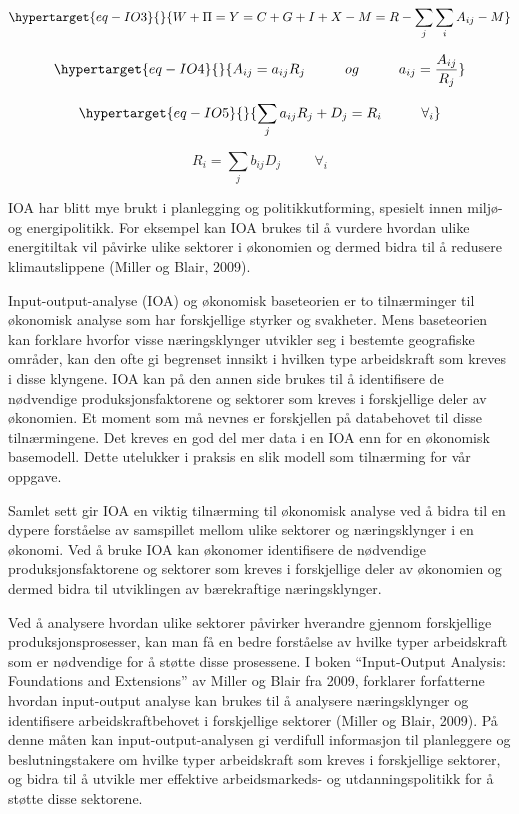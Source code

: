 \documentclass[
]{article}
\begin{document}
\begin{equation}\protect\hypertarget{eq-IO3}{}{
W + \Pi = Y = C + G + I + X - M = R - \sum_j \sum_i A_{ij} - M
}\label{eq-IO3}\end{equation}

\begin{equation}\protect\hypertarget{eq-IO4}{}{
A_{ij} = a_{ij}R_j \hspace{1cm} og \hspace{1cm} a_{ij} = \frac{A_{ij}}{R_j}
}\label{eq-IO4}\end{equation}

\begin{equation}\protect\hypertarget{eq-IO5}{}{
\sum_{j} a_{ij}R_j + D_j = R_i \hspace{1cm} \forall_{i}
}\label{eq-IO5}\end{equation}

\[
R_i = \sum_{j} b_{ij}D_j \hspace{1cm} \forall_{i}
\]

IOA har blitt mye brukt i planlegging og politikkutforming, spesielt
innen miljø- og energipolitikk. For eksempel kan IOA brukes til å
vurdere hvordan ulike energitiltak vil påvirke ulike sektorer i
økonomien og dermed bidra til å redusere klimautslippene (Miller og
Blair, 2009).

Input-output-analyse (IOA) og økonomisk baseteorien er to tilnærminger
til økonomisk analyse som har forskjellige styrker og svakheter. Mens
baseteorien kan forklare hvorfor visse næringsklynger utvikler seg i
bestemte geografiske områder, kan den ofte gi begrenset innsikt i
hvilken type arbeidskraft som kreves i disse klyngene. IOA kan på den
annen side brukes til å identifisere de nødvendige produksjonsfaktorene
og sektorer som kreves i forskjellige deler av økonomien. Et moment som
må nevnes er forskjellen på databehovet til disse tilnærmingene. Det
kreves en god del mer data i en IOA enn for en økonomisk basemodell.
Dette utelukker i praksis en slik modell som tilnærming for vår oppgave.

Samlet sett gir IOA en viktig tilnærming til økonomisk analyse ved å
bidra til en dypere forståelse av samspillet mellom ulike sektorer og
næringsklynger i en økonomi. Ved å bruke IOA kan økonomer identifisere
de nødvendige produksjonsfaktorene og sektorer som kreves i forskjellige
deler av økonomien og dermed bidra til utviklingen av bærekraftige
næringsklynger.

Ved å analysere hvordan ulike sektorer påvirker hverandre gjennom
forskjellige produksjonsprosesser, kan man få en bedre forståelse av
hvilke typer arbeidskraft som er nødvendige for å støtte disse
prosessene. I boken ``Input-Output Analysis: Foundations and
Extensions'' av Miller og Blair fra 2009, forklarer forfatterne hvordan
input-output analyse kan brukes til å analysere næringsklynger og
identifisere arbeidskraftbehovet i forskjellige sektorer (Miller og
Blair, 2009). På denne måten kan input-output-analysen gi verdifull
informasjon til planleggere og beslutningstakere om hvilke typer
arbeidskraft som kreves i forskjellige sektorer, og bidra til å utvikle
mer effektive arbeidsmarkeds- og utdanningspolitikk for å støtte disse
sektorene.
\end{document}
